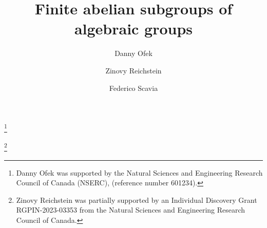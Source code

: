 \documentclass[12pt]{amsart}
\numberwithin{equation}{section}
\theoremstyle{remark}
\begin{document}
\author{Danny Ofek}   
\address{Department of Mathematics\\
	University of British Columbia\\
	Vancouver, BC V6T 1Z2\\Canada}
\thanks{Danny Ofek was supported by the Natural Sciences and Engineering Research Council of Canada (NSERC), (reference number 601234).}


\author{Zinovy Reichstein}
\address{Department of Mathematics\\
	University of British Columbia\\
	Vancouver, BC V6T 1Z2\\Canada}
\thanks{{Zinovy Reichstein was partially supported by 
        an Individual Discovery Grant RGPIN-2023-03353 from the
	Natural Sciences and Engineering Research Council of Canada.}
}

\author{Federico Scavia}
\address{CNRS\\
	Institut Galil\'ee\\
	Universit\'e Sorbonne Paris Nord\\
	99 avenue Jean-Baptiste Cl\'ement, 93430\\ 
	Villetaneuse, France}


%
% 



\title{Finite abelian subgroups of algebraic groups}
\end{document}
